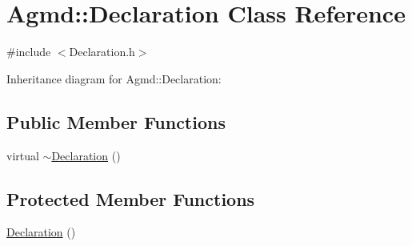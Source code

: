 \hypertarget{class_agmd_1_1_declaration}{\section{Agmd\+:\+:Declaration Class Reference}
\label{class_agmd_1_1_declaration}
}


{\ttfamily \#include $<$Declaration.\+h$>$}



Inheritance diagram for Agmd\+:\+:Declaration\+:
\subsection*{Public Member Functions}
\begin{DoxyCompactItemize}
\item 
virtual \hyperlink{class_agmd_1_1_declaration_a69f91dfc583236cc26d20858ec9120d2}{$\sim$\+Declaration} ()
\end{DoxyCompactItemize}
\subsection*{Protected Member Functions}
\begin{DoxyCompactItemize}
\item 
\hyperlink{class_agmd_1_1_declaration_a7f757ec263b3e2fbfdc9bc56a8069601}{Declaration} ()
\end{DoxyCompactItemize}


